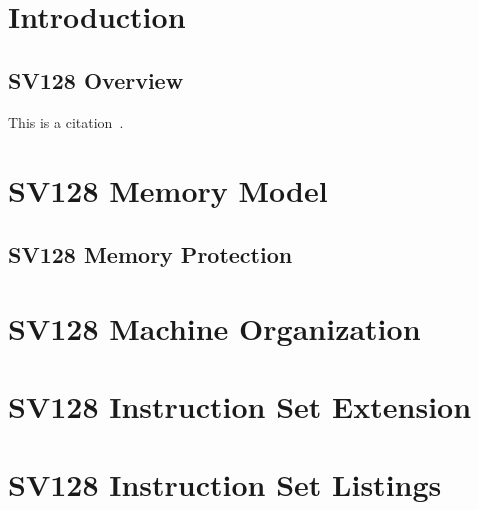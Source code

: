\documentclass{article}
\begin{document}
\section{Introduction}
\label{sec:Introduction}

\subsection{SV128 Overview}
\label{sec:SV128Overview}

This is a citation~\cite{RVSuperSPec}.

\clearpage
\section{SV128 Memory Model}
\label{sec:SV128MemoryModel}

\subsection{SV128 Memory Protection}
\label{sec:SV128MemoryProtection}

\clearpage
\section{SV128 Machine Organization}
\label{sec:SV128MachineOrganization}

\clearpage
\section{SV128 Instruction Set Extension}
\label{sec:SV128InstructionSetExtension}

\clearpage
\section{SV128 Instruction Set Listings}
\label{sec:SV128InstructionSetListings}
\end{document}
